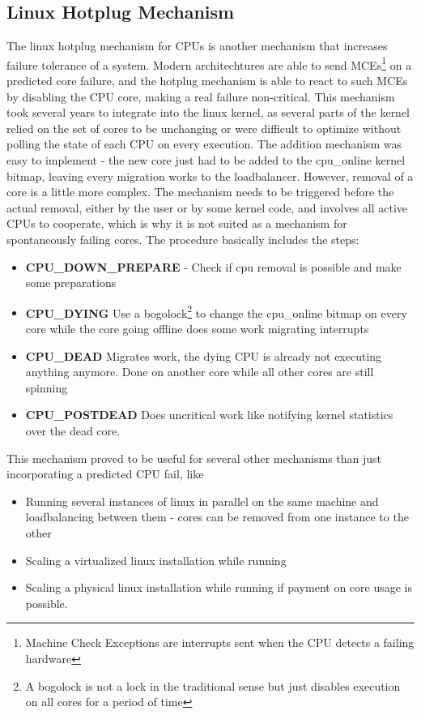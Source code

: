 \documentclass[a4paper,10pt,twoside]{article}
\begin{document}
\subsection{Linux Hotplug Mechanism} \label{hotplug}
The linux hotplug mechanism for CPUs \cite{Linux_Hotplug} is another mechanism that increases failure tolerance of a system. Modern architechtures are able to send MCEs\footnote{Machine Check Exceptions are interrupts sent when the CPU detects a failing hardware} on a predicted core failure, and the hotplug mechanism is able to react to such MCEs by disabling the CPU core, making a real failure non-critical. This mechanism took several years to integrate into the linux kernel, as several parts of the kernel relied on the set of cores to be unchanging or were difficult to optimize without polling the state of each CPU on every execution. The addition mechanism was easy to implement - the new core just had to be added to the cpu\_online kernel bitmap, leaving every migration works to the loadbalancer. However, removal of a core is a little more complex. The mechanism needs to be triggered before the actual removal, either by the user or by some kernel code, and involves all active CPUs to cooperate, which is why it is not suited as a mechanism for spontaneously failing cores. The procedure basically includes the steps:
\begin{itemize}
	\item \textbf{CPU\_DOWN\_PREPARE} - Check if cpu removal is possible and make some preparations
	\item \textbf{CPU\_DYING} Use a bogolock\footnote{A bogolock is not a lock in the traditional sense but just disables execution on all cores for a period of time} to change the cpu\_online bitmap on every core while the core going offline does some work migrating interrupts
	\item \textbf{CPU\_DEAD} Migrates work, the dying CPU is already not executing anything anymore. Done on another core while all other cores are still spinning
	\item \textbf{CPU\_POSTDEAD} Does uncritical work like notifying kernel statistics over the dead core.
\end{itemize}

This mechanism proved to be useful for several other mechanisms than just incorporating a predicted CPU fail, like
\begin{itemize}
	\item Running several instances of linux in parallel on the same machine and loadbalancing between them - cores can be removed from one instance to the other
	\item Scaling a virtualized linux installation while running
	\item Scaling a physical linux installation while running if payment on core usage is possible.
\end{itemize}
\end{document}
